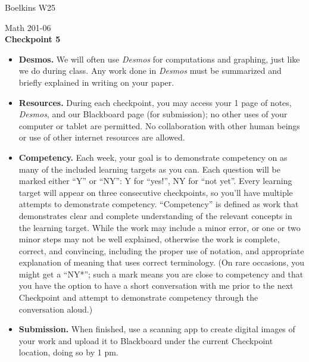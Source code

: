 \documentclass[11 pt]{article}
\begin{document}
 \hfill Boelkins  W25\\
 
\begin{center}
Math 201-06 \\
{\bf Checkpoint 5}
\end{center}



\begin{itemize}
	
	\item {\bf Desmos.} We will often use \emph{Desmos} for computations and graphing, just like we do during class.  Any work done in \emph{Desmos} must be summarized and briefly explained in writing on your paper.  
	
	\item {\bf Resources.} During each checkpoint, you may access your 1 page of notes, \emph{Desmos}, and our Blackboard page (for submission); no other uses of your computer or tablet are permitted.  No collaboration with other human beings or use of other internet resources are allowed.
	
	\item {\bf Competency.} Each week, your goal is to demonstrate competency on as many of the included learning targets as you can.  Each question will be marked either ``Y'' or ``NY'': Y for ``yes!'', NY for ``not yet''.  Every learning target will appear on three consecutive checkpoints, so you'll have multiple attempts to demonstrate competency.  ``Competency'' is defined as work that demonstrates clear and complete understanding of the relevant concepts in the learning target. While the work may include a minor error, or one or two minor steps may not be well explained, otherwise the work is complete, correct, and convincing, including the proper use of notation, and appropriate explanation of meaning that uses correct terminology.  (On rare occasions, you might get a ``NY*''; such a mark means you are close to competency and that you have the option to have a short conversation with me prior to the next Checkpoint and attempt to demonstrate competency through the conversation aloud.)	
	
	\item {\bf Submission.}  When finished, use a scanning app to create digital images of your work and upload it to Blackboard under the current Checkpoint location, doing so by 1 pm.
	
\end{itemize}
\end{document}
